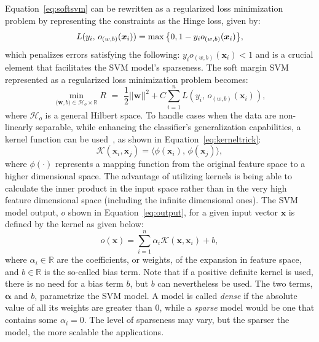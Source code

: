 \documentclass[reqno]{vcuthesis}
\newcommand{\set}[1]{{\left\{#1\right\}}}
\newcommand{\reals}{{\mathbb{R}}}
\newcommand{\spa}[1]{\mathcal{#1}}
\numberwithin{equation}{chapter}
\begin{document}
Equation~\ref{eq:softsvm} can be rewritten as a regularized loss minimization problem by representing the constraints as the Hinge loss, given by:
\begin{equation}
\centering
L(y_i,\, o_{(w,b)}(\bm{x}_i)) = \max \set{0, 1 - y_i o_{(w,b)}(\bm{x}_i)},
\end{equation}
which penalizes errors satisfying the following: $ y_i o_{(w,b)}(\bm{x}_i) < 1$ and is a crucial element that facilitates the SVM model's sparseness. The soft margin SVM represented as a regularized loss minimization problem becomes:
\begin{equation}
\label{eqn:reghingeloss}
\min\limits_{\bm (\bm{w},b) \in \mathcal{H}_o \times \reals} R {\,\,} = {\,\,} \frac{1}{2}||\bm{w}||^2 + C\sum_{i=1}^n L(y_i,\, o_{(w,b)}(\bm{x}_i)),
\end{equation}
where $\mathcal{H}_o$ is a general Hilbert space. To handle cases when the data are non-linearly separable, while enhancing the classifier's generalization capabilities, a kernel function can be used~\cite{Aizerman67theoretical}, as shown in Equation~\ref{eq:kerneltrick}:
\begin{equation}
\spa{K}\left(\bm{x}_i,\bm{x}_j\right) = \langle \phi\left(\bm{x}_i\right),\,\phi\left(\bm{x}_j\right)\rangle,
\label{eq:kerneltrick}
\end{equation}
where $\phi(\cdot)$ represents a mapping function from the original feature space to a higher dimensional space. The advantage of utilizing kernels is being able to calculate the inner product in the input space rather than in the very high feature dimensional space (including the infinite dimensional ones). The SVM model output, $o$ shown in Equation~\ref{eq:output}, for a given input vector $\bm{x}$ is defined by the kernel as given below:
\begin{equation}
o(\bm x) = \sum_{i = 1}^n \alpha_i \mathcal{K}(\bm x, \bm{x}_i) + b,
\label{eq:output}
\end{equation}
where $\alpha_i \in \reals$ are the coefficients, or weights, of the expansion in feature space, and $b \in \reals$ is the so-called bias term. Note that if a positive definite kernel is used, there is no need for a bias term $b$, but $b$ can nevertheless be used. The two terms, $\bm \alpha$ and $b$, parametrize the SVM model. A model is called \textit{dense} if the absolute value of all its weights are greater than $0$, while a \textit{sparse} model would be one that contains some $\alpha_i = 0$. The level of sparseness may vary, but the sparser the model, the more scalable the applications.
\end{document}
